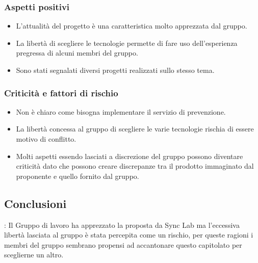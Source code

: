 		\subsubsection{Aspetti positivi}
			\begin{itemize}
				\item L’attualità del progetto è una caratteristica molto apprezzata dal gruppo.
				\item La libertà di scegliere le tecnologie permette di fare uso dell’esperienza pregressa di alcuni membri del gruppo.
				\item Sono stati segnalati diversi progetti realizzati sullo stesso tema.
			\end{itemize}
			
		\subsubsection{Criticità e fattori di rischio}
			\begin{itemize}
				\item Non è chiaro come bisogna implementare il servizio di prevenzione.
				\item La libertà concessa al gruppo di scegliere le varie tecnologie rischia di essere motivo di conflitto.
				\item Molti aspetti essendo lasciati a discrezione del gruppo possono diventare criticità dato che possono creare discrepanze tra il prodotto immaginato dal proponente e quello fornito dal gruppo.
			\end{itemize}
		\subsection{Conclusioni}:
			Il Gruppo di lavoro ha apprezzato la proposta da Sync Lab ma l’eccessiva libertà lasciata al gruppo è stata percepita come un rischio, per queste ragioni i membri del gruppo sembrano propensi ad accantonare questo capitolato per sceglierne un altro.
				
				
				
				
				
				
				
				
				
				
				
				
				
				
				
				
				
				
				
				
				